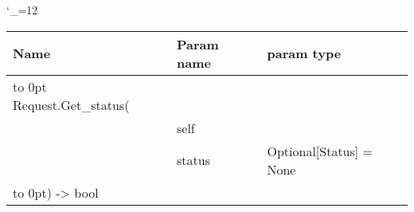 \begingroup \catcode`\_=12 \tt
\begin{tabular}{lll}
\toprule
\textrm{Name}&\textrm{Param name}&\textrm{param type}\\
\midrule
\hbox to 0pt {Request.Get_status(\hss}\\
& self\\
& status & Optional[Status] = None\\
\hbox to 0pt{) -> bool\hss}\\
\bottomrule
\end{tabular}
\endgroup
